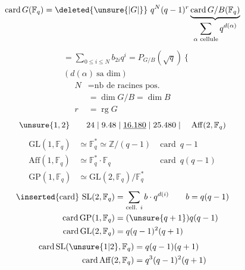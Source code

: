 \[\operatorname{card}G(\mathbb F_q)=\deleted{\unsure{\lvert G\rvert}}\ q^N(q-1)^r\underbrace{\operatorname{card}G/B(\mathbb F_q)}_{\displaystyle\sum_{\alpha\text{ cellule}}q^{d(\alpha)}}\]
\[\begin{aligned}{}&=\sum_{0\leq i\leq N}b_{2i}q^i=P_{G/B}(\sqrt q)\ \Bigg\{\\[-2pt]&(d(\alpha)\ \text{sa dim})\end{aligned}\]
\[\begin{aligned}N&=\text{nb de racines pos.}\\&=\dim G/B=\dim B\\r&=\operatorname{rg}G\end{aligned}\]
\[\unsure{1,2}\qquad 24\mid9.48\mid\underline{16.180}\mid25.480\mid\quad\mathrm{Aff}(2,\mathbb F_q)\]
\[\begin{aligned}\mathrm{GL}(1,\mathbb F_q)&\simeq\mathbb F_q^*\simeq\mathbb Z/(q-1)&\operatorname{card}\ q-1\\ \mathrm{Aff}(1,\mathbb F_q)&\simeq\mathbb F_q^*\cdot\mathbb F_q&\operatorname{card}\ q(q-1)\\ \mathrm{GP}(1,\mathbb F_q)&\simeq\mathrm{GL}(2,\mathbb F_q)/\mathbb F_q^*\end{aligned}\]
\[\begin{aligned}\inserted{\text{card}}\ \mathrm{SL}(2,\mathbb F_q)&=\sum_{\text{cell. }i}b\cdot q^{d(i)}\qquad b=q(q-1)\\ \operatorname{card}\mathrm{GP}(1,\mathbb F_q)&=(\unsure{q+1})q(q-1)\\ \operatorname{card}\mathrm{GL}(2,\mathbb F_q)&=q(q-1)^2(q+1)\end{aligned}\]
\[\begin{aligned}\operatorname{card}\mathrm{SL}(\unsure{1|2},\mathbb F_q)&=q(q-1)(q+1)\\ \operatorname{card}\mathrm{Aff}(2,\mathbb F_q)&=q^3(q-1)^2(q+1)\end{aligned}\]
